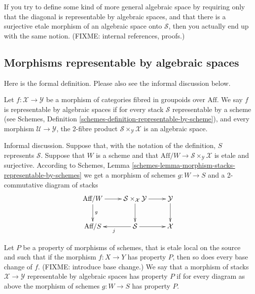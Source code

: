 \begin{remark}
\label{remark-definition-correct}
If you try to define some kind of more general algebraic space by requiring
only that the diagonal is representable by algebraic spaces, and that there is
a surjective etale morphism of an algebraic space onto $\mathcal{S}$, then 
you actually end up with the same notion.
(FIXME: internal references, proofs.)
\end{remark}

\subsection{Morphisms representable by algebraic spaces}
\label{subsection-morphism-representable-by-algebraic-spaces}

\noindent
Here is the formal definition. Please also see the informal discussion below.

\begin{definition}
\label{definition-representable-by-algebraic-spaces}
Let $f : \mathcal{X} \to \mathcal{Y}$ be a morphism of categories
fibred in groupoids over $\text{Aff}$. We say $f$ is representable by
algebraic spaces if for every stack $\mathcal{S}$ representable by a scheme
(see Schemes, Definition \ref{schemes-definition-representable-by-scheme}),
and every morphism $\mathcal{U} \to \mathcal{Y}$, the 2-fibre product
$\mathcal{S}\times_\mathcal{Y}\mathcal{X}$ is an algebraic space.
\end{definition}

\noindent
Informal discussion. Suppose that, with the notation of the definition,
$S$ represents $\mathcal{S}$. Suppose that $W$ is a scheme and that
$\text{Aff}/W \to \mathcal{S}\times_\mathcal{Y}\mathcal{X}$ is 
etale and surjective. According to
Schemes, Lemma \ref{schemes-lemma-morphism-stacks-representable-by-schemes}
we get a morphism of schemes $g : W \to S$ and a 2-commutative diagram
of stacks
$$
\xymatrix{
\text{Aff}/W \ar[d]^g \ar[r] &
\mathcal{S}\times_\mathcal{X}\mathcal{Y} \ar[d] \ar[r] &
\mathcal{Y} \ar[d] \\
\text{Aff}/S &
\mathcal{S} \ar[l]^j \ar[r] & \mathcal{X}
}
$$

\begin{definition}
\label{definition-property-morphism-representable-by-algebraic-spaces}
Let $P$ be a property of morphisms of schemes, that is etale local
on the source and such that if the morphism $f : X \to Y$ has property $P$,
then so does every base change of $f$. (FIXME: introduce base change.)
We say that a morphism of stacks $\mathcal{X}
\to \mathcal{Y}$ representable by algebraic spaces has property
$P$ if for every diagram as above the morphism of schemes
$g : W \to S$ has property $P$.
\end{definition}

